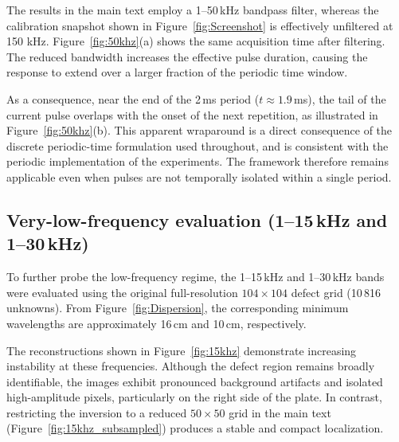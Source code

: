 \documentclass[a4paper,fleqn]{cas-sc}
\begin{document}
The results in the main text employ a 1--50\,kHz bandpass filter, whereas the calibration snapshot shown in Figure~\ref{fig:Screenshot} is effectively unfiltered at 150 kHz. Figure~\ref{fig:50khz}(a) shows the same acquisition time after filtering. The reduced bandwidth increases the effective pulse duration, causing the response to extend over a larger fraction of the periodic time window.

As a consequence, near the end of the 2\,ms period ($t\approx1.9$\,ms), the tail of the current pulse overlaps with the onset of the next repetition, as illustrated in Figure~\ref{fig:50khz}(b). This apparent wraparound is a direct consequence of the discrete periodic-time formulation used throughout, and is consistent with the periodic implementation of the experiments. The framework therefore remains applicable even when pulses are not temporally isolated within a single period.

\subsection{Very-low-frequency evaluation (1--15\,kHz and 1--30\,kHz)}
\label{Appendix_15khz}

To further probe the low-frequency regime, the 1--15\,kHz and 1--30\,kHz bands were evaluated using the original full-resolution $104\times104$ defect grid (10\,816 unknowns). From Figure~\ref{fig:Dispersion}, the corresponding minimum wavelengths are approximately 16\,cm and 10\,cm, respectively.

The reconstructions shown in Figure~\ref{fig:15khz} demonstrate increasing instability at these frequencies. Although the defect region remains broadly identifiable, the images exhibit pronounced background artifacts and isolated high-amplitude pixels, particularly on the right side of the plate. In contrast, restricting the inversion to a reduced $50\times50$ grid in the main text (Figure~\ref{fig:15khz_subsampled}) produces a stable and compact localization.
\end{document}
